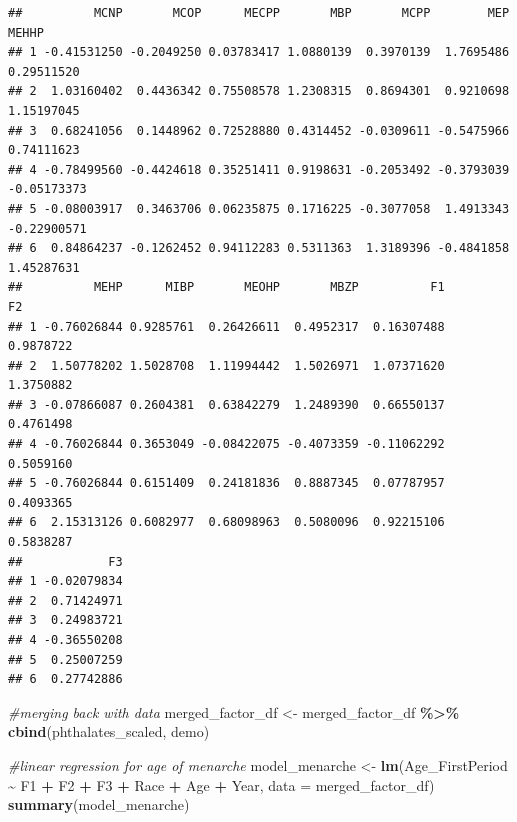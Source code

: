 \documentclass[
]{article}
\newenvironment{Shaded}{\begin{snugshade}}{\end{snugshade}}
\newcommand{\AttributeTok}[1]{\textcolor[rgb]{0.13,0.29,0.53}{#1}}
\newcommand{\CommentTok}[1]{\textcolor[rgb]{0.56,0.35,0.01}{\textit{#1}}}
\newcommand{\FunctionTok}[1]{\textcolor[rgb]{0.13,0.29,0.53}{\textbf{#1}}}
\newcommand{\NormalTok}[1]{#1}
\newcommand{\OtherTok}[1]{\textcolor[rgb]{0.56,0.35,0.01}{#1}}
\newcommand{\SpecialCharTok}[1]{\textcolor[rgb]{0.81,0.36,0.00}{\textbf{#1}}}
\begin{document}
\begin{verbatim}
##          MCNP       MCOP      MECPP       MBP       MCPP        MEP       MEHHP
## 1 -0.41531250 -0.2049250 0.03783417 1.0880139  0.3970139  1.7695486  0.29511520
## 2  1.03160402  0.4436342 0.75508578 1.2308315  0.8694301  0.9210698  1.15197045
## 3  0.68241056  0.1448962 0.72528880 0.4314452 -0.0309611 -0.5475966  0.74111623
## 4 -0.78499560 -0.4424618 0.35251411 0.9198631 -0.2053492 -0.3793039 -0.05173373
## 5 -0.08003917  0.3463706 0.06235875 0.1716225 -0.3077058  1.4913343 -0.22900571
## 6  0.84864237 -0.1262452 0.94112283 0.5311363  1.3189396 -0.4841858  1.45287631
##          MEHP      MIBP       MEOHP       MBZP          F1        F2
## 1 -0.76026844 0.9285761  0.26426611  0.4952317  0.16307488 0.9878722
## 2  1.50778202 1.5028708  1.11994442  1.5026971  1.07371620 1.3750882
## 3 -0.07866087 0.2604381  0.63842279  1.2489390  0.66550137 0.4761498
## 4 -0.76026844 0.3653049 -0.08422075 -0.4073359 -0.11062292 0.5059160
## 5 -0.76026844 0.6151409  0.24181836  0.8887345  0.07787957 0.4093365
## 6  2.15313126 0.6082977  0.68098963  0.5080096  0.92215106 0.5838287
##            F3
## 1 -0.02079834
## 2  0.71424971
## 3  0.24983721
## 4 -0.36550208
## 5  0.25007259
## 6  0.27742886
\end{verbatim}

\begin{Shaded}
\begin{Highlighting}[]
\CommentTok{\#merging back with data}
\NormalTok{merged\_factor\_df }\OtherTok{\textless{}{-}}\NormalTok{ merged\_factor\_df }\SpecialCharTok{\%\textgreater{}\%}
  \FunctionTok{cbind}\NormalTok{(phthalates\_scaled, demo)}

\CommentTok{\#linear regression for age of menarche}
\NormalTok{model\_menarche }\OtherTok{\textless{}{-}} \FunctionTok{lm}\NormalTok{(Age\_FirstPeriod }\SpecialCharTok{\textasciitilde{}}\NormalTok{ F1 }\SpecialCharTok{+}\NormalTok{ F2 }\SpecialCharTok{+}\NormalTok{ F3 }\SpecialCharTok{+}\NormalTok{ Race }\SpecialCharTok{+}\NormalTok{ Age }\SpecialCharTok{+}\NormalTok{ Year, }\AttributeTok{data =}\NormalTok{ merged\_factor\_df)}
\FunctionTok{summary}\NormalTok{(model\_menarche)}
\end{Highlighting}
\end{Shaded}
\end{document}

